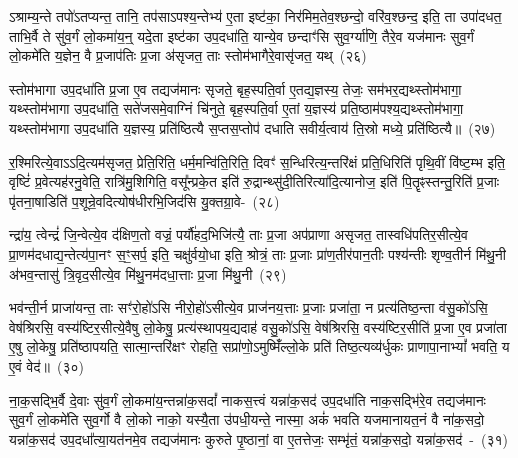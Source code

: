 ऽश्राम्य॒न्ते तपो॑\-ऽतप्यन्त॒ तानि॒ तप॑साऽपश्य॒न्तेभ्य॑ ए॒ता इष्ट॑का॒ निर॑मिम॒तेव॒श्छन्दो॒ वरि॑व॒श्छन्द॒ इति॒ ता उपा॑दधत॒ ताभि॒र्वै ते सु॑व॒र्गं लो॒कमा॑य॒न्॒ यदे॒ता इष्ट॑का उप॒\-दधा॑ति॒ यान्ये॒व छन्दाꣳ॑सि सुव॒र्ग्या॑णि॒ तैरे॒व यज॑मानः सुव॒र्गं लो॒कमे॑ति य॒ज्ञेन॒ वै प्र॒जा\-प॑तिः प्र॒जा अ॑सृजत॒ ताः स्तोम॑भागैरे॒वासृ॑जत॒ यथ्~(२६)\ip

स्तोम॑भागा उप॒\-दधा॑ति प्र॒जा ए॒व तद्यज॑मानः सृजते॒ बृह॒स्पति॒र्वा ए॒तद्य॒ज्ञस्य॒ तेजः॒ सम॑भर॒द्यथ्स्तोम॑भागा॒ यथ्स्तोम॑भागा उप॒\-दधा॑ति॒ सते॑जसमे॒वाग्निं चि॑नुते॒ बृह॒स्पति॒र्वा ए॒तां य॒ज्ञस्य॑ प्रति॒ष्ठाम॑पश्य॒द्यथ्स्तोम॑भागा॒ यथ्स्तोम॑भागा उप॒\-दधा॑ति य॒ज्ञस्य॒ प्रति॑ष्ठित्यै स॒प्तस॒प्तोप॑ दधाति सवीर्य॒त्वाय॑ ति॒स्रो मध्ये॒ प्रति॑ष्ठित्यै॥~(२७)\ip

{\anuvakamend[{उ॒त्त॒र॒तो ध॑त्ते॒ तस्मा॑दुपधी॒यन्त॒ ऋष॑यो\-ऽसृजत॒ यत् त्रिच॑त्वारिꣳशच्च}]}

र॒श्मिरित्ये॒वा\-ऽऽ\-दि॒त्यम॑सृजत॒ प्रेति॒रिति॒ धर्म॒मन्वि॑ति॒रिति॒ दिवꣳ॑ स॒न्धिरित्य॒न्तरि॑क्षं प्रति॒धिरिति॑ पृथि॒वीं वि॑ष्ट॒म्भ इति॒ वृष्टिं॑ प्र॒वेत्यह॑रनु॒वेति॒ रात्रि॑मु॒शिगिति॒ वसू᳚न्प्रके॒त इति॑ रु॒द्रान्थ्सु॑दी॒तिरित्या॑दि॒त्यानोज॒ इति॑ पि॒तॄꣴस्तन्तु॒रिति॑ प्र॒जाः पृ॑तना॒षाडिति॑ प॒शून्रे॒वदित्योष॑धीरभि॒जिद॑सि यु॒क्तग्रा॒वे-~(२८)\ip

न्द्रा॑य॒ त्वेन्द्रं॑ जि॒न्वेत्ये॒व द॑क्षिण॒तो वज्रं॒ पर्यौ॑हद॒भिजि॑त्यै॒ ताः प्र॒जा अप॑प्राणा असृजत॒ तास्वधि॑\-पतिर॒सीत्ये॒व प्रा॒णम॑दधाद्य॒न्तेत्य॑पा॒नꣳ स॒ꣳ॒सर्प॒ इति॒ चक्षु॑र्वयो॒धा इति॒ श्रोत्रं॒ ताः प्र॒जाः प्रा॑ण॒तीर॑पान॒तीः पश्य॑न्तीः शृण्व॒तीर्न मि॑थु॒नी अ॑भव॒न्तासु॑ त्रि॒वृद॒सीत्ये॒व मि॑थु॒नम॑दधा॒त्ताः प्र॒जा मि॑थु॒नी~(२९)\ip

भव॑न्ती॒र्न प्राजा॑यन्त॒ ताः सꣳ॑रो॒हो॑\-ऽसि नीरो॒हो॑\-ऽसीत्ये॒व प्राज॑नय॒त्ताः प्र॒जाः प्रजा॑ता॒ न प्रत्य॑तिष्ठ॒न्ता व॑सु॒को॑\-ऽसि॒ वेष॑श्रिरसि॒ वस्य॑ष्टिर॒सीत्ये॒वैषु लो॒केषु॒ प्रत्य॑स्थापय॒द्यदाह॑ वसु॒को॑\-ऽसि॒ वेष॑श्रिरसि॒ वस्य॑ष्टिर॒सीति॑ प्र॒जा ए॒व प्रजा॑ता ए॒षु लो॒केषु॒ प्रति॑\-ष्ठापयति॒ सात्मा॒न्तरि॑क्षꣳ रोहति॒ सप्रा॑णो॒\-ऽमुष्मिँ॑ल्लो॒के प्रति॑ तिष्ठ॒त्यव्य॑र्धुकः प्राणापा॒ना\-भ्यां᳚ भवति॒ य ए॒वं वेद॑॥~(३०)\ip

{\anuvakamend[{यु॒क्तग्रा॑वा प्र॒जा मि॑थु॒न्य॑न्तरि॑क्षं॒ द्वाद॑श च}]}

ना॒क॒सद्भि॒र्वै दे॒वाः सु॑व॒र्गं लो॒कमा॑य॒न्तन्ना॑क॒सदां᳚ नाकस॒त्त्वं यन्ना॑क॒सद॑ उप॒\-दधा॑ति नाक॒सद्भि॑रे॒व तद्यज॑मानः सुव॒र्गं लो॒कमे॑ति सुव॒र्गो वै लो॒को नाको॒ यस्यै॒ता उ॑पधी॒यन्ते॒ नास्मा॒ अकं॑ भवति यजमानायत॒नं वै ना॑क॒सदो॒ यन्ना॑क॒सद॑ उप॒दधा᳚त्या॒यत॑नमे॒व तद्यज॑मानः कुरुते पृ॒ष्ठानां॒ वा ए॒तत्तेजः॒ सम्भृ॑तं॒ यन्ना॑क॒सदो॒ यन्ना॑क॒सद॑~-~(३१)\ip

